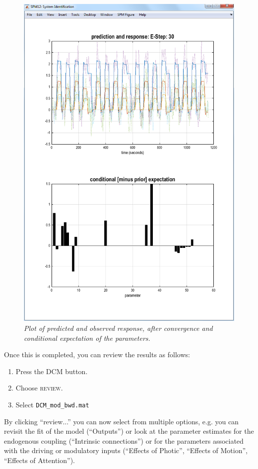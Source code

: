 \begin{figure}[ht]
\begin{center}
\includegraphics[width=140mm]{dcm/Fig8}
\caption{\em Plot of predicted and observed response, after convergence and conditional expectation of the parameters.\label{dcm_fig8}}
\end{center}
\end{figure}

Once this is completed, you can review the results as follows:
\begin{enumerate}
\item Press the DCM button.
\item Choose \textsc{review}.
\item Select \texttt{DCM\_mod\_bwd.mat}
\end{enumerate}
By clicking ``review...'' you can now select from multiple options, e.g. you can revisit the fit of the model (``Outputs'') or look at the parameter estimates for the endogenous coupling (``Intrinsic connections'') or for the parameters associated with the driving or modulatory inputs (``Effects of Photic'', ``Effects of Motion'', ``Effects of Attention'').

